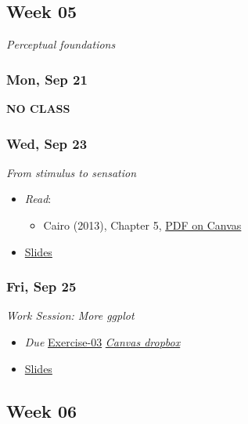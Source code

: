 \documentclass[
  letterpaper,
  DIV=11,
  numbers=noendperiod]{scrartcl}
\providecommand{\tightlist}{%
  \setlength{\itemsep}{0pt}\setlength{\parskip}{0pt}}
\begin{document}
\subsection*{Week 05}\label{week-05}

\emph{Perceptual foundations}

\subsubsection*{Mon, Sep 21}\label{mon-sep-21}

\textbf{NO CLASS}

\subsubsection*{Wed, Sep 23}\label{wed-sep-23}

\emph{From stimulus to sensation}

\begin{itemize}
\tightlist
\item
  \emph{Read}:

  \begin{itemize}
  \tightlist
  \item
    Cairo (2013), Chapter 5,
    \href{https://psu.instructure.com/courses/2484925/files?preview=193582613}{PDF
    on Canvas}
  \end{itemize}
\item
  \href{404.qmd}{Slides}
\end{itemize}

\subsubsection*{Fri, Sep 25}\label{fri-sep-25}

\emph{Work Session: More ggplot}

\begin{itemize}
\tightlist
\item
   \emph{Due}
  \href{exercises/ex-03-making-data.qmd}{Exercise-03} \textbar{}
  \href{https://psu.instructure.com/courses/2484925/assignments/18448437}{
  \emph{Canvas dropbox}} \textbar{}
\item
  \href{404.qmd}{Slides}
\end{itemize}

\subsection*{Week 06}\label{week-06}
\end{document}
